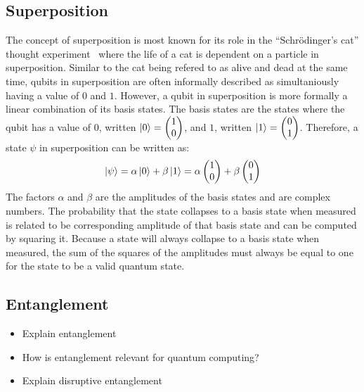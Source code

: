 \subsection{Superposition}
The concept of superposition is most known for its role in the ``Schrödinger's cat'' thought experiment~\cite{Wine13} where the life of a cat is dependent on a particle in superposition. Similar to the cat being refered to as alive and dead at the same time, qubits in superposition are often informally described as simultaniously having a value of $0$ and $1$. However, a qubit in superposition is more formally a linear combination of its basis states. The basis states are the states where the qubit has a value of $0$, written $\ket{0} = \begin{pmatrix} 1 \\ 0 \end{pmatrix}$, and $1$, written $\ket{1} = \begin{pmatrix} 0 \\ 1 \end{pmatrix}$. Therefore, a state $\psi$ in superposition can be written as:
\begin{equation*}
    \ket{\psi} = \alpha \ket{0} + \beta \ket{1} = \alpha \begin{pmatrix} 1 \\ 0 \end{pmatrix} + \beta \begin{pmatrix} 0 \\ 1 \end{pmatrix}
\end{equation*}
The factors $\alpha$ and $\beta$ are the amplitudes of the basis states and are complex numbers. The probability that the state collapses to a basis state when measured is related to be corresponding amplitude of that basis state and can be computed by squaring it. Because a state will always collapse to a basis state when measured, the sum of the squares of the amplitudes must always be equal to one for the state to be a valid quantum state.

\subsection{Entanglement}
\begin{itemize}
    \item Explain entanglement
    \item How is entanglement relevant for quantum computing?
    \item Explain disruptive entanglement
\end{itemize}


